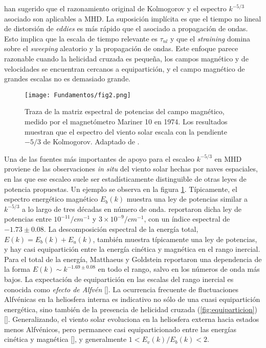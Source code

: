 \cite{fyfe_high-beta_1976} han sugerido que el razonamiento original
de Kolmogorov y el espectro $k^{-5/3}$ asociado son aplicables a
MHD. La suposición implícita es que el tiempo no lineal de distorsión
de \textit{eddies} es más rápido que el asociado a propagación de
ondas. Esto implica que la escala de tiempo relevante es $\tau_{nl}$ y
que el \textit{straining} domina sobre el
\textit{sweeping} aleatorio y la propagación de ondas. Este enfoque
parece razonable cuando la helicidad cruzada es pequeña, los campos
magnético y de velocidades se encuentran cercanos a equipartición, y
el campo magnético de grandes escalas no es demasiado grande.

\begin{figure}[h]
  \centering
  \texttt{[image: Fundamentos/fig2.png]}
  \caption{Traza de la matriz espectral de potencias del campo
    magnético, medido por el magnetómetro Mariner 10 en 1974. Los
    resultados muestran que el espectro del viento solar escala con la
    pendiente $-5/3$ de Kolmogorov. Adaptado de
    \cite{goldstein_magnetohydrodynamic_1995}.}
  \label{fig:experimentalcascade}
\end{figure}

Una de las fuentes más importantes de apoyo para el escaleo $k^{-5/3}$
en MHD proviene de las observaciones \textit{in situ} del viento solar
hechas por naves espaciales, en las que ese escaleo suele ser
estadísticamente distinguible de otras leyes de potencia
propuestas. Un ejemplo se observa en la figura
\ref{fig:experimentalcascade}. Típicamente, el espectro energético
magnético $E_b(k)$ muestra una ley de potencias similar a $k^{-5/3}$ a
lo largo de tres décadas en número de
onda. \cite{matthaeus_measurement_1982} reportaron dicha ley de
potencias entre $10^{-11}/cm^{-1}$ y $3\times 10^{-9}/cm^{-1}$, con un
índice espectral de $-1.73\pm0.08$. La descomposición espectral de la
energía total, $E(k) = E_b(k) + E_u(k)$, también muestra típicamente
una ley de potencias, y hay casi equipartición entre la energía
cinética y magnética en el rango inercial. Para el total de la
energía, Matthaeus y Goldstein reportaron una dependencia de la forma
$E(k)\sim k^{-1.69\pm0.08}$ en todo el rango, salvo en los números de
onda más bajos. La expectación de equipartición en las escalas del
rango inercial es conocida como \textit{efecto de Alfv\'en}
[\cite{kraichnan_inertial-range_1965}]. La ocurrencia frecuente de
fluctuaciones Alfv\'enicas en la heliosfera interna es indicativo no
sólo de una cuasi equipartición energética, sino también de la
presencia de helicidad cruzada (\cref{fig:equiparticion})
[\cite{coleman_turbulence_1968, dobrowolny_fully_1980,
grappin_alfvenic_1982, grappin_dependence_1983,
pouquet_growth_1986}]. Generalizando, el viento solar evoluciona en la
heliosfera externa hacia estados menos Alfv\'enicos, pero permanece
casi equiparticionado entre las energías cinética y magnética
[\cite{roberts_origin_1987, roberts_amplitudes_1990}], y generalmente
$1<E_v(k)/E_b(k)<2$.

